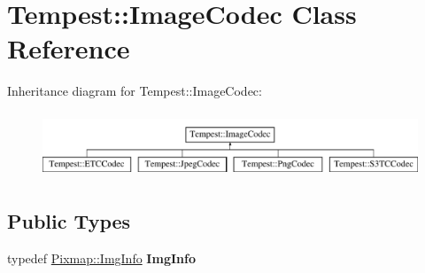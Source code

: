 \hypertarget{class_tempest_1_1_image_codec}{\section{Tempest\+:\+:Image\+Codec Class Reference}
\label{class_tempest_1_1_image_codec}
}
Inheritance diagram for Tempest\+:\+:Image\+Codec\+:\begin{figure}[H]
\begin{center}
\leavevmode
\includegraphics[height=1.971831cm]{class_tempest_1_1_image_codec}
\end{center}
\end{figure}
\subsection*{Public Types}
\begin{DoxyCompactItemize}
\item 
\hypertarget{class_tempest_1_1_image_codec_a1fce4efcec49dc1c9399eb417bcf1148}{typedef \hyperlink{struct_tempest_1_1_pixmap_1_1_img_info}{Pixmap\+::\+Img\+Info} {\bfseries Img\+Info}}\label{class_tempest_1_1_image_codec_a1fce4efcec49dc1c9399eb417bcf1148}

\end{DoxyCompactItemize}
